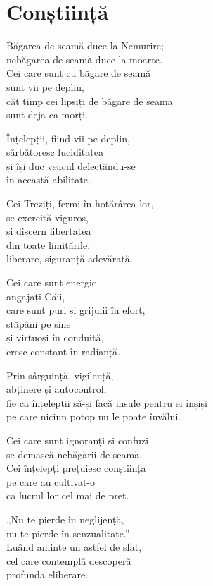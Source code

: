 
\chapter{Conștiință}

Băgarea de seamă duce la Nemurire;\\
nebăgarea de seamă duce la moarte.\\
Cei care sunt cu băgare de seamă\\
sunt vii pe deplin,\\
cât timp cei lipsiți de băgare de seama\\
sunt deja ca morți.

Înțelepții, fiind vii pe deplin,\\
sărbătoresc luciditatea\\
și își duc veacul delectându-se\\
în această abilitate.


Cei Treziți, fermi în hotărârea lor,\\
se exercită viguros,\\
și discern libertatea\\
din toate limitările:\\
liberare, siguranță adevărată.


Cei care sunt energic\\
angajați Căii,\\
care sunt puri și grijulii în efort,\\
stăpâni pe sine\\
și virtuoși în conduită,\\
cresc constant în radianță.


Prin sârguință, vigilență,\\
abținere și autocontrol,\\
fie ca înțelepții să-și facă insule pentru ei înșiși\\
pe care niciun potop nu le poate învălui.



Cei care sunt ignoranți și confuzi\\
se demască nebăgării de seamă.\\
Cei înțelepți prețuiesc conștiința\\
pe care au cultivat-o\\
ca lucrul lor cel mai de preț.


„Nu te pierde în neglijență,\\
nu te pierde în senzualitate.”\\
Luând aminte un astfel de sfat,\\
cel care contemplă descoperă\\
profunda eliberare.

